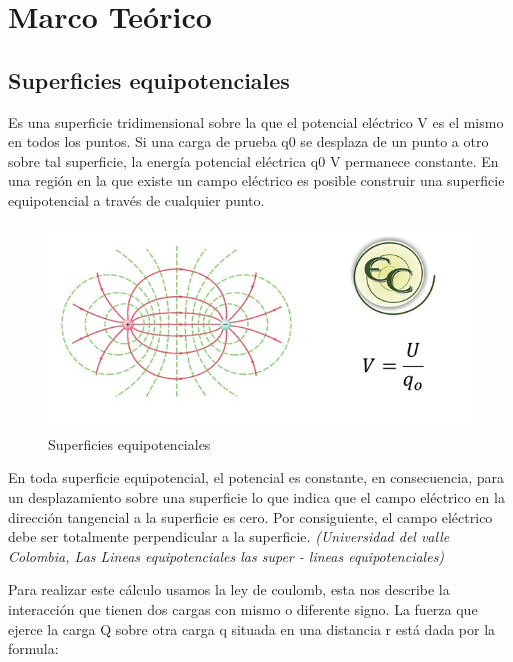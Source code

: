 \documentclass[letterpaper, 12pt]{report}
\begin{document}
\newpage

\section{Marco Teórico}

\subsection{Superficies equipotenciales}

Es una superficie tridimensional sobre la que el potencial
eléctrico V es el mismo en todos los puntos. Si una carga de prueba q0 se 
desplaza de un punto a otro sobre tal superficie, la energía potencial 
eléctrica q0 V permanece constante. En una región en la que existe un campo 
eléctrico es posible construir una superficie equipotencial a través de 
cualquier punto.

\begin{figure}[H]
	\begin{center}
		\includegraphics[scale = 1]{./Images/Equipotenciales.png}
		\caption{Superficies equipotenciales}
	\end{center}
\end{figure}

En toda superficie equipotencial, el potencial es constante, en consecuencia,
para un desplazamiento sobre una superficie lo que indica que el campo
eléctrico en la dirección tangencial a la superficie es cero. Por consiguiente, 
el campo eléctrico debe ser totalmente perpendicular a la superficie.
\textit{(Universidad del valle Colombia, Las Lineas equipotenciales las super 
- lineas equipotenciales)}

\vspace{1.5cm}

Para realizar este cálculo usamos la ley de coulomb, esta nos describe la 
interacción que  tienen dos cargas con mismo o diferente signo. 
La fuerza que ejerce la carga Q sobre otra carga q situada en una distancia r 
está dada por la formula:
\end{document}
